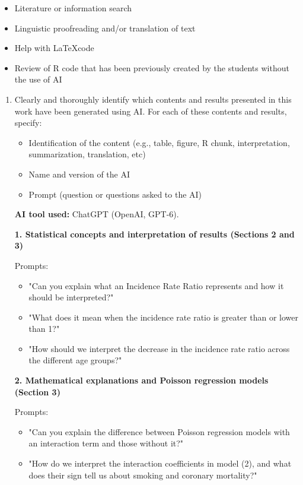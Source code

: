 \documentclass[10pt,a4paper,twoside]{article}\usepackage[]{graphicx}\usepackage[]{xcolor}
\begin{document}
\begin{itemize}
    \item Literature or information search
    \item Linguistic proofreading and/or translation of text
    \item Help with \LaTeX code
    \item Review of R code that has been previously created by the students without the use of AI
\end{itemize}
\begin{enumerate}
    \item Clearly and thoroughly identify which contents and results presented in this work have been generated using AI. For each of these contents and results, specify:
    \begin{itemize}
        \item  Identification of the content (e.g., table, figure, R chunk, interpretation, summarization, translation, etc)
        \item Name and version of the AI
        \item Prompt (question or questions asked to the AI)
    \end{itemize}
\textbf{AI tool used:} ChatGPT (OpenAI, GPT-6).

\textbf{1. Statistical concepts and interpretation of results (Sections 2 and 3)}

Prompts:
\begin{itemize}
    \item "Can you explain what an Incidence Rate Ratio represents and how it should be interpreted?"
    \item "What does it mean when the incidence rate ratio is greater than or lower than 1?"
    \item "How should we interpret the decrease in the incidence rate ratio across the different age groups?"
\end{itemize}

\textbf{2. Mathematical explanations and Poisson regression models (Section 3)}

Prompts:
\begin{itemize}
    \item "Can you explain the difference between Poisson regression models with an interaction term and those without it?"
    \item "How do we interpret the interaction coefficients in model (2), and what does their sign tell us about smoking and coronary mortality?"
\end{itemize}


\end{enumerate}
\end{document}
